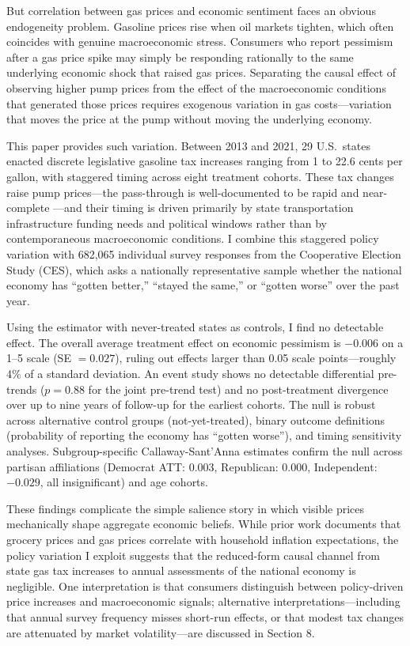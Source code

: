 \documentclass[12pt]{article}
\begin{document}
But correlation between gas prices and economic sentiment faces an obvious endogeneity problem. Gasoline prices rise when oil markets tighten, which often coincides with genuine macroeconomic stress. Consumers who report pessimism after a gas price spike may simply be responding rationally to the same underlying economic shock that raised gas prices. Separating the causal effect of observing higher pump prices from the effect of the macroeconomic conditions that generated those prices requires exogenous variation in gas costs---variation that moves the price at the pump without moving the underlying economy.

This paper provides such variation. Between 2013 and 2021, 29 U.S.\ states enacted discrete legislative gasoline tax increases ranging from 1 to 22.6 cents per gallon, with staggered timing across eight treatment cohorts. These tax changes raise pump prices---the pass-through is well-documented to be rapid and near-complete \citep{li2014gasoline}---and their timing is driven primarily by state transportation infrastructure funding needs and political windows rather than by contemporaneous macroeconomic conditions. I combine this staggered policy variation with 682,065 individual survey responses from the Cooperative Election Study (CES), which asks a nationally representative sample whether the national economy has ``gotten better,'' ``stayed the same,'' or ``gotten worse'' over the past year.

Using the \citet{callaway2021difference} estimator with never-treated states as controls, I find no detectable effect. The overall average treatment effect on economic pessimism is $-0.006$ on a 1--5 scale (SE $= 0.027$), ruling out effects larger than 0.05 scale points---roughly 4\% of a standard deviation. An event study shows no detectable differential pre-trends ($p = 0.88$ for the joint pre-trend test) and no post-treatment divergence over up to nine years of follow-up for the earliest cohorts. The null is robust across alternative control groups (not-yet-treated), binary outcome definitions (probability of reporting the economy has ``gotten worse''), and timing sensitivity analyses. Subgroup-specific Callaway-Sant'Anna estimates confirm the null across partisan affiliations (Democrat ATT: $0.003$, Republican: $0.000$, Independent: $-0.029$, all insignificant) and age cohorts.

These findings complicate the simple salience story in which visible prices mechanically shape aggregate economic beliefs. While prior work documents that grocery prices \citep{dacunto2021exposure} and gas prices \citep{binder2022stuck} correlate with household inflation expectations, the policy variation I exploit suggests that the reduced-form causal channel from state gas tax increases to annual assessments of the national economy is negligible. One interpretation is that consumers distinguish between policy-driven price increases and macroeconomic signals; alternative interpretations---including that annual survey frequency misses short-run effects, or that modest tax changes are attenuated by market volatility---are discussed in Section 8.
\end{document}

